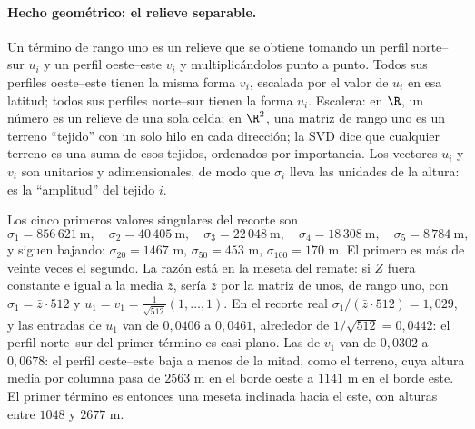 \paragraph{Hecho geométrico: el relieve separable.} Un término de rango uno es un relieve
que se obtiene tomando un perfil norte--sur \(u_i\) y un perfil oeste--este \(v_i\) y
multiplicándolos punto a punto. Todos sus perfiles oeste--este tienen la misma forma
\(v_i\), escalada por el valor de \(u_i\) en esa latitud; todos sus perfiles norte--sur tienen
la forma \(u_i\). Escalera: en \(\R\), un número es un relieve de una sola celda; en
\(\R^2\), una matriz de rango uno es un terreno ``tejido'' con un solo hilo en cada
dirección; la SVD dice que cualquier terreno es una suma de esos tejidos, ordenados por
importancia. Los vectores \(u_i\) y \(v_i\) son unitarios y adimensionales, de modo que
\(\sigma_i\) lleva las unidades de la altura: es la ``amplitud'' del tejido \(i\).

Los cinco primeros valores singulares del recorte son
\[
  \sigma_1=856\,621\ \text{m},\quad
  \sigma_2=40\,405\ \text{m},\quad
  \sigma_3=22\,048\ \text{m},\quad
  \sigma_4=18\,308\ \text{m},\quad
  \sigma_5=8\,784\ \text{m},
\]
y siguen bajando: \(\sigma_{20}=1467\) m, \(\sigma_{50}=453\) m, \(\sigma_{100}=170\) m. El
primero es más de veinte veces el segundo. La razón está en la meseta del remate: si \(Z\) fuera
constante e igual a la media \(\bar z\), sería \(\bar z\) por la matriz de unos, de rango uno,
con \(\sigma_1=\bar z\cdot512\) y \(u_1=v_1=\tfrac1{\sqrt{512}}(1,\dots,1)\). En el
recorte real \(\sigma_1/(\bar z\cdot512)=1{,}029\), y las entradas de \(u_1\) van de
\(0{,}0406\) a \(0{,}0461\), alrededor de \(1/\sqrt{512}=0{,}0442\): el perfil norte--sur del
primer término es casi plano. Las de \(v_1\) van de \(0{,}0302\) a \(0{,}0678\): el perfil
oeste--este baja a menos de la mitad, como el terreno, cuya altura media por columna pasa de
\(2563\) m en el borde oeste a \(1141\) m en el borde este. El primer término es entonces una
meseta inclinada hacia el este, con alturas entre \(1048\) y \(2677\) m.

